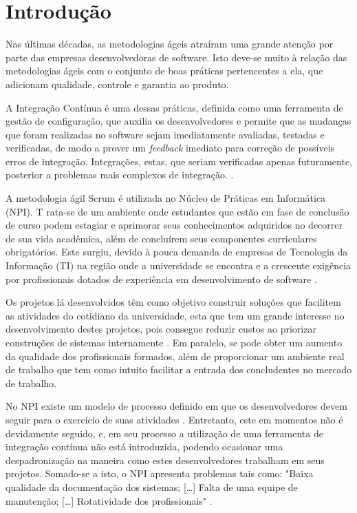 \chapter{Introdução}

Nas últimas décadas, as metodologias ágeis atraíram uma grande atenção por parte das empresas desenvolvedoras de software. Isto deve-se muito à relação das metodologias ágeis com o conjunto de boas práticas pertencentes a ela, que adicionam qualidade, controle e garantia ao produto.


A Integração Contínua é uma dessas práticas, definida como uma ferramenta de gestão de configuração, que auxilia os desenvolvedores e permite que as mudanças que foram realizadas no software sejam imediatamente avaliadas, testadas e verificadas, de modo a prover um \textit{feedback} imediato para correção de possíveis erros de integração. Integrações, estas, que seriam verificadas apenas futuramente, posterior a problemas mais complexos de integração. \cite{paul2007}.

A metodologia ágil Scrum é utilizada no Núcleo de Práticas em Informática (NPI). T	rata-se de um ambiente onde estudantes que estão em fase de conclusão de curso podem estagiar e aprimorar seus conhecimentos adquiridos no decorrer de sua vida acadêmica, além de concluírem seus componentes curriculares obrigatórios. Este surgiu, devido à pouca demanda de empresas de Tecnologia da Informação (TI) na região onde a universidade se encontra e a crescente exigência por profissionais dotados de experiência em desenvolvimento de software \cite{npi2013}.

Os projetos lá desenvolvidos têm como objetivo construir soluções que facilitem as atividades do cotidiano da universidade, esta que tem um grande interesse no desenvolvimento destes projetos, pois consegue reduzir custos ao priorizar construções de sistemas internamente \cite{npi2013}. Em paralelo, se pode obter um aumento da qualidade dos profissionais formados, além de proporcionar um ambiente real de trabalho que tem como intuito facilitar a entrada dos concludentes no mercado de trabalho.

No NPI existe um modelo de processo definido em que os desenvolvedores devem seguir para o exercício de suas atividades \cite{npi2013}. Entretanto, este em momentos não é devidamente seguido, e, em seu processo a utilização de uma ferramenta de integração contínua não está introduzida, podendo ocasionar uma despadronização na maneira como estes  desenvolvedores trabalham em seus projetos. Somado-se a isto, o NPI apresenta problemas tais como: "Baixa qualidade da documentação dos sistemas; [\ldots] Falta de uma equipe de manutenção; [\ldots] Rotatividade dos profissionais" \cite[p.~4]{paduelli2006}.

